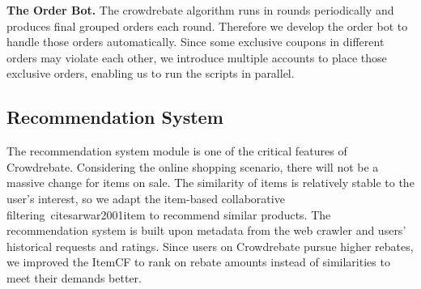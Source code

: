 \textbf{The Order Bot.} The crowdrebate algorithm runs in rounds periodically and produces final grouped orders each round. Therefore we develop the order bot to handle those orders automatically. Since some exclusive coupons in different orders may violate each other, we introduce multiple accounts to place those exclusive orders, enabling us to run the scripts in parallel.

\subsection{Recommendation System}

The recommendation system module is one of the critical features of Crowdrebate. Considering the online shopping scenario, there will not be a massive change for items on sale. The similarity of items is relatively stable to the user’s interest, so we adapt the item-based collaborative filtering~cite{sarwar2001item} to recommend similar products. The recommendation system is built upon metadata from the web crawler and users’ historical requests and ratings. Since users on Crowdrebate pursue higher rebates, we improved the ItemCF to rank on rebate amounts instead of similarities to meet their demands better. 